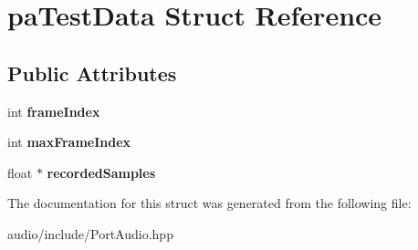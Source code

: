 \hypertarget{structpa_test_data}{}\section{pa\+Test\+Data Struct Reference}
\label{structpa_test_data}
\subsection*{Public Attributes}
\begin{DoxyCompactItemize}
\item 
\mbox{\label{structpa_test_data_ab6998ce9ea16a1cbfd92239f9db30091}} 
int {\bfseries frame\+Index}
\item 
\mbox{\label{structpa_test_data_af927cb4284f8d465356704d60690fba5}} 
int {\bfseries max\+Frame\+Index}
\item 
\mbox{\label{structpa_test_data_a7d998f00d501e39a7ef025d79d6f918a}} 
float $\ast$ {\bfseries recorded\+Samples}
\end{DoxyCompactItemize}


The documentation for this struct was generated from the following file\+:\begin{DoxyCompactItemize}
\item 
audio/include/Port\+Audio.\+hpp\end{DoxyCompactItemize}
